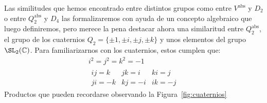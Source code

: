 \begin{ejemplo}
    Las similitudes que hemos encontrado entre distintos grupos como entre $V^{\text{abs}}$ y $D_2$ o entre $Q^{\text{abs}}_2$ y $D_4$ las formalizaremos con ayuda de un concepto algebraico que luego definiremos, pero merece la pena destacar ahora una similaritud entre $Q_2^{\text{abs}}$, el grupo de los cuaternios $Q_2 = \{\pm 1, \pm i,\pm j,\pm k\}$ y unos elementos del grupo $\SL_2(\mathbb{C})$. Para familiarizarnos con los cuaternios, estos cumplen que:
    \begin{gather*}
        i^2 = j^2 = k^2 = -1 \\
        \begin{array}{ccc}
            ij = k & jk = i & ki = j \\
            ji = -k & kj = -i & ik = -j
        \end{array}
    \end{gather*}
    Productos que pueden recordarse observando la Figura~\ref{fig:cuaternios}
    \begin{figure}[H]
        \centering
\end{figure}
\end{ejemplo}
